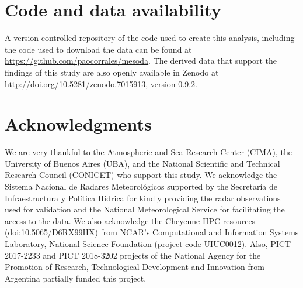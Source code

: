\documentclass[preprint, 3p, authoryear,review, 12pt]{elsarticle} %
\begin{document}
\hypertarget{code-and-data-availability}{%
\section{Code and data availability}\label{code-and-data-availability}}

A version-controlled repository of the code used to create this analysis, including the code used to download the data can be found at \url{https://github.com/paocorrales/mesoda}. The derived data that support the findings of this study are also openly available in Zenodo at http://doi.org/10.5281/zenodo.7015913, version 0.9.2.

\hypertarget{acknowledgments}{%
\section*{Acknowledgments}\label{acknowledgments}}

We are very thankful to the Atmospheric and Sea Research Center (CIMA), the University of Buenos Aires (UBA), and the National Scientific and Technical Research Council (CONICET) who support this study. We acknowledge the Sistema Nacional de Radares Meteorológicos supported by the Secretaría de Infraestructura y Política Hídrica for kindly providing the radar observations used for validation and the National Meteorological Service for facilitating the access to the data. We also acknowledge the Cheyenne HPC resources (doi:10.5065/D6RX99HX) from NCAR's Computational and Information Systems Laboratory, National Science Foundation (project code UIUC0012). Also, PICT 2017-2233 and PICT 2018-3202 projects of the National Agency for the Promotion of Research, Technological Development and Innovation from Argentina partially funded this project.

\renewcommand\refname{References}

\end{document}
